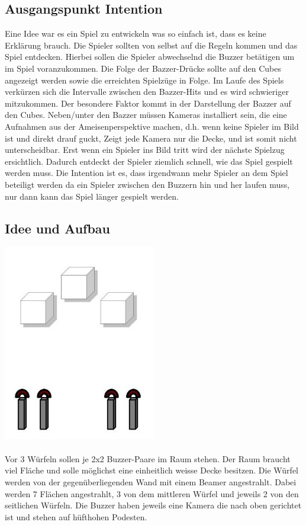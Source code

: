 \documentclass[pdftex,12pt,a4paper]{report}
\begin{document}
\subsection{Ausgangspunkt Intention}
Eine Idee war es ein Spiel zu entwickeln was so einfach ist, dass es keine Erklärung brauch. Die Spieler sollten von selbst auf die Regeln kommen und das Spiel entdecken.
Hierbei sollen die Spieler abwechselnd die Buzzer betätigen um im Spiel voranzukommen. Die Folge der Bazzer-Drücke sollte auf den Cubes angezeigt werden sowie die erreichten Spielzüge in Folge. Im Laufe des Spiels verkürzen sich die Intervalle zwischen den Bazzer-Hits und es wird schwieriger mitzukommen. Der besondere Faktor kommt in der Darstellung der Bazzer auf den Cubes. Neben/unter den Bazzer müssen Kameras installiert sein, die eine Aufnahmen aus der Ameisenperspektive machen, d.h. wenn keine Spieler im Bild ist und direkt drauf guckt, Zeigt jede Kamera nur die Decke, und ist somit nicht unterscheidbar. Erst wenn ein Spieler ins Bild tritt wird der nächste Spielzug ersichtlich. Dadurch entdeckt der Spieler ziemlich schnell, wie das Spiel gespielt werden muss. Die Intention ist es, dass irgendwann mehr Spieler an dem Spiel beteiligt werden da ein Spieler zwischen den Buzzern hin und her laufen muss, nur dann kann das Spiel länger gespielt werden.

\subsection{Idee und Aufbau}
\includegraphics[width=0.5\textwidth]{./perspektiv}\\[0.3cm]   
\\
Vor 3 Würfeln sollen je 2x2 Buzzer-Paare im Raum stehen. Der Raum braucht viel Fläche und solle möglichst eine einheitlich weisse Decke besitzen. Die Würfel werden von der gegenüberliegenden Wand mit einem Beamer angestrahlt. Dabei werden 7 Flächen angestrahlt, 3 von dem mittleren Würfel und jeweils 2 von den seitlichen Würfeln. Die Buzzer haben jeweils eine Kamera die nach oben gerichtet ist und stehen auf hüfthohen Podesten.
\end{document}
